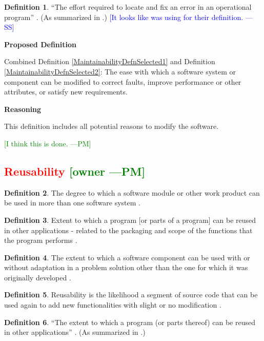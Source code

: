 \documentclass[letterpaper,cleveref]{lipics-v2019}
\newcommand{\authornote}[3]{\textcolor{#1}{[#3 ---#2]}}
\newcommand{\authornote}[3]{}
\newcommand{\wss}[1]{\authornote{blue}{SS}{#1}} %
\newcommand{\pmi}[1]{\authornote{green}{PM}{#1}} %
\newcommand{\notdone}[1]{\textcolor{red}{#1}}
\theoremstyle{definition}
\newtheorem{defn}{Definition}
\begin{document}
\begin{defn}
  ``The effort required to locate and fix an error in an operational program''
  \citep{McCallEtAl1977}. (As summarized in \citet{VanVliet2000}.) \wss{It looks
    like \citet{pressman2005software} was using \citet{McCallEtAl1977} for their
    definition.}
\end{defn}

\noindent \textbf{Proposed Definition}

Combined Definition \ref{MaintainabilityDefnSelected1} and Definition
\ref{MaintainabilityDefnSelected2}: The ease with which a software system or
component can be modified to correct faults, improve performance or other
attributes, or satisfy new requirements.

\noindent \textbf{Reasoning}

This definition includes all potential reasons to modify the software. 

\pmi{I think this is done.}

\subsection{\notdone{Reusability} \pmi{owner}}

\begin{defn} 
The degree to which a software module or other work product can be used in more
than one software system \citep{IEEEStdGlossarySET1990}. 
\end{defn}
\begin{defn}
Extent to which a program [or parts of a program] can be reused in other
applications - related to the packaging and scope of the functions that the
program performs \citep{pressman2005software}.
\end{defn}
\begin{defn} \label{ReusabilityDefnSelected}
The extent to which a software component can be used with or without adaptation
in a problem solution other than the one for which it was originally developed
\citep{kalagiakos2003non}.
\end{defn}
\begin{defn}
Reusability is the likelihood a segment of source code that can be used again to
add new functionalities with slight or no modification \citep{sandhu2010survey}.
\end{defn}

\begin{defn}
  ``The extent to which a program (or parts thereof) can be reused in other
  applications'' \citep{McCallEtAl1977}. (As summarized in
  \citet{VanVliet2000}.)
\end{defn}
\end{document}
